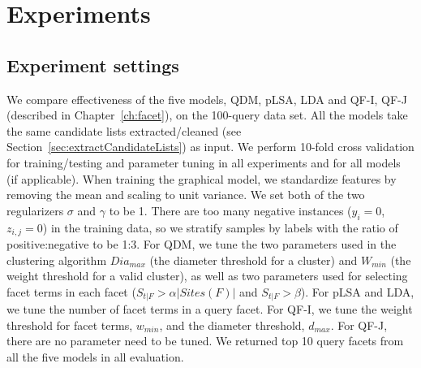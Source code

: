 \section{Experiments}
\label{sec:ie-exp}
\subsection{Experiment settings}
We compare effectiveness of the five models, QDM, pLSA, LDA and QF-I, QF-J (described in Chapter~\ref{ch:facet}), on the 100-query data set.
All the models take the same candidate lists extracted/cleaned (see Section~\ref{sec:extractCandidateLists}) as input.
We perform 10-fold cross validation for training/testing and parameter tuning in all experiments and for all models (if applicable).
When training the graphical model, we standardize features by removing the mean and scaling to unit variance.
We set both of the two regularizers $\sigma$ and $\gamma$ to be 1.
There are too many negative instances ($y_i=0$, $z_{i,j}=0$) in the training data, so we stratify samples by labels with the ratio of positive:negative to be 1:3.
For QDM, we tune the two parameters used in the clustering algorithm $Dia_{max}$ (the diameter threshold for a cluster) and $W_{min}$ (the weight threshold for a valid cluster), as well as two parameters used for selecting facet terms in each facet ($S_{t|F} > \alpha |Sites(F)|$ and $S_{t|F}>\beta$).
For pLSA and LDA, we tune the number of facet terms in a query facet.
For QF-I, we tune the weight threshold for facet terms, $w_{min}$, and the diameter threshold,  $d_{max}$.
For QF-J, there are no parameter need to be tuned.
We returned top 10 query facets from all the five models in all evaluation. 
